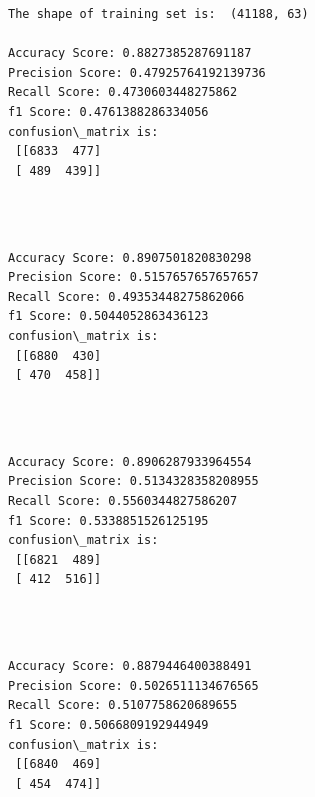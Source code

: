 \documentclass[11pt]{article}
\begin{document}
 

    \begin{Verbatim}[commandchars=\\\{\}]
The shape of training set is:  (41188, 63) 

Accuracy Score: 0.8827385287691187
Precision Score: 0.47925764192139736
Recall Score: 0.4730603448275862
f1 Score: 0.4761388286334056
confusion\_matrix is: 
 [[6833  477]
 [ 489  439]] 


    \end{Verbatim}

    \begin{center}
    \end{center}
    { \hspace*{\fill} \\}
    
    \begin{Verbatim}[commandchars=\\\{\}]
Accuracy Score: 0.8907501820830298
Precision Score: 0.5157657657657657
Recall Score: 0.49353448275862066
f1 Score: 0.5044052863436123
confusion\_matrix is: 
 [[6880  430]
 [ 470  458]] 


    \end{Verbatim}

    \begin{center}
    \end{center}
    { \hspace*{\fill} \\}
    
    \begin{Verbatim}[commandchars=\\\{\}]
Accuracy Score: 0.8906287933964554
Precision Score: 0.5134328358208955
Recall Score: 0.5560344827586207
f1 Score: 0.5338851526125195
confusion\_matrix is: 
 [[6821  489]
 [ 412  516]] 


    \end{Verbatim}

    \begin{center}
    \end{center}
    { \hspace*{\fill} \\}
    
    \begin{Verbatim}[commandchars=\\\{\}]
Accuracy Score: 0.8879446400388491
Precision Score: 0.5026511134676565
Recall Score: 0.5107758620689655
f1 Score: 0.5066809192944949
confusion\_matrix is: 
 [[6840  469]
 [ 454  474]] 


    \end{Verbatim}
\end{document}
